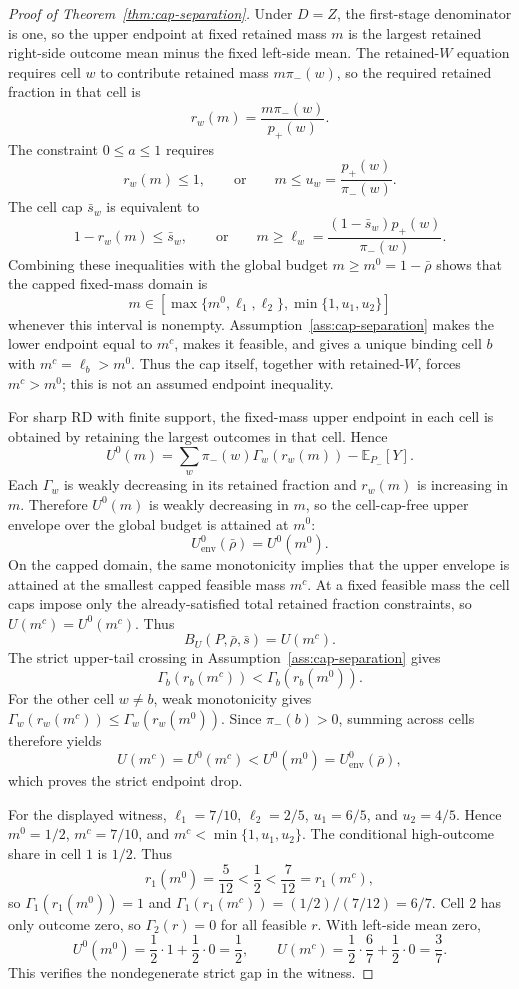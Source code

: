 \documentclass[11pt]{article}
\newcommand{\E}{\mathbb{E}}
\theoremstyle{definition}
\theoremstyle{plain}
\theoremstyle{remark}
\begin{document}
\begin{proof}[Proof of Theorem~\ref{thm:cap-separation}]
Under \(D=Z\), the first-stage denominator is one, so the upper endpoint at fixed retained
mass \(m\) is the largest retained right-side outcome mean minus the fixed left-side mean.
The retained-\(W\) equation requires cell \(w\) to contribute retained mass
\(m\pi_-(w)\), so the required retained fraction in that cell is
\[
  r_w(m)=\frac{m\pi_-(w)}{p_+(w)}.
\]
The constraint \(0\le a\le1\) requires
\[
  r_w(m)\le1,
  \qquad\text{or}\qquad
  m\le u_w=\frac{p_+(w)}{\pi_-(w)}.
\]
The cell cap \(\bar s_w\) is equivalent to
\[
  1-r_w(m)\le\bar s_w,
  \qquad\text{or}\qquad
  m\ge\ell_w=\frac{(1-\bar s_w)p_+(w)}{\pi_-(w)}.
\]
Combining these inequalities with the global budget \(m\ge m^0=1-\bar\rho\) shows that
the capped fixed-mass domain is
\[
  m\in
  \left[
    \max\{m^0,\ell_1,\ell_2\},
    \min\{1,u_1,u_2\}
  \right]
\]
whenever this interval is nonempty.  Assumption~\ref{ass:cap-separation} makes the lower
endpoint equal to \(m^c\), makes it feasible, and gives a unique binding cell \(b\) with
\(m^c=\ell_b>m^0\).  Thus the cap itself, together with retained-\(W\), forces
\(m^c>m^0\); this is not an assumed endpoint inequality.

For sharp RD with finite support, the fixed-mass upper endpoint in each cell is obtained
by retaining the largest outcomes in that cell.  Hence
\[
  U^0(m)
  =
  \sum_w \pi_-(w)\Gamma_w(r_w(m))-\E_{P_-}[Y].
\]
Each \(\Gamma_w\) is weakly decreasing in its retained fraction and \(r_w(m)\) is
increasing in \(m\).  Therefore \(U^0(m)\) is weakly decreasing in \(m\), so the
cell-cap-free upper envelope over the global budget is attained at \(m^0\):
\[
  U^0_{\mathrm{env}}(\bar\rho)=U^0(m^0).
\]
On the capped domain, the same monotonicity implies that the upper envelope is attained at
the smallest capped feasible mass \(m^c\).  At a fixed feasible mass the cell caps impose
only the already-satisfied total retained fraction constraints, so \(U(m^c)=U^0(m^c)\).
Thus
\[
  B_U(P,\bar\rho,\bar s)=U(m^c).
\]
The strict upper-tail crossing in Assumption~\ref{ass:cap-separation} gives
\[
  \Gamma_b(r_b(m^c))<\Gamma_b(r_b(m^0)).
\]
For the other cell \(w\ne b\), weak monotonicity gives
\(\Gamma_w(r_w(m^c))\le\Gamma_w(r_w(m^0))\).  Since \(\pi_-(b)>0\), summing across cells
therefore yields
\[
  U(m^c)=U^0(m^c)<U^0(m^0)=U^0_{\mathrm{env}}(\bar\rho),
\]
which proves the strict endpoint drop.

For the displayed witness, \(\ell_1=7/10\), \(\ell_2=2/5\),
\(u_1=6/5\), and \(u_2=4/5\).  Hence \(m^0=1/2\), \(m^c=7/10\), and \(m^c<\min\{1,u_1,u_2\}\).
The conditional high-outcome share in cell \(1\) is \(1/2\).  Thus
\[
  r_1(m^0)=\frac{5}{12}<\frac12<\frac{7}{12}=r_1(m^c),
\]
so \(\Gamma_1(r_1(m^0))=1\) and
\(\Gamma_1(r_1(m^c))=(1/2)/(7/12)=6/7\).  Cell \(2\) has only outcome zero, so
\(\Gamma_2(r)=0\) for all feasible \(r\).  With left-side mean zero,
\[
  U^0(m^0)=\frac12\cdot1+\frac12\cdot0=\frac12,\qquad
  U(m^c)=\frac12\cdot\frac67+\frac12\cdot0=\frac37.
\]
This verifies the nondegenerate strict gap in the witness.


\end{proof}
\end{document}
